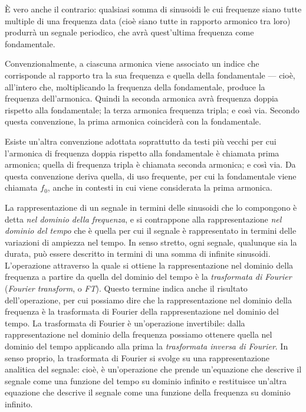 \documentclass[11pt]{report}
\begin{document}
È vero anche il contrario: qualsiasi somma di sinusoidi le cui frequenze siano tutte multiple di una frequenza data (cioè siano tutte in rapporto armonico tra loro) produrrà un segnale periodico, che avrà quest'ultima frequenza come fondamentale.

Convenzionalmente, a ciascuna armonica viene associato un indice che corrisponde al rapporto tra la sua frequenza e quella della fondamentale --- cioè, all'intero che, moltiplicando la frequenza della fondamentale, produce la frequenza dell'armonica. Quindi la seconda armonica avrà frequenza doppia rispetto alla fondamentale; la terza armonica frequenza tripla; e così via. Secondo questa convenzione, la prima armonica coinciderà con la fondamentale.

Esiste un'altra convenzione adottata soprattutto da testi più vecchi per cui l'armonica di frequenza doppia rispetto alla fondamentale è chiamata prima armonica; quella di frequenza tripla è chiamata seconda armonica; e così via. Da questa convenzione deriva quella, di uso frequente, per cui la fondamentale viene chiamata $f_0$, anche in contesti in cui viene considerata la prima armonica.

La rappresentazione di un segnale in termini delle sinusoidi che lo compongono è detta \emph{nel dominio della frequenza}, e si contrappone alla rappresentazione \emph{nel dominio del tempo} che è quella per cui il segnale è rappresentato in termini delle variazioni di ampiezza nel tempo. In senso stretto, ogni segnale, qualunque sia la durata, può essere descritto in termini di una somma di infinite sinusoidi. L'operazione attraverso la quale si ottiene la rappresentazione nel dominio della frequenza a partire da quella del dominio del tempo è la \emph{trasformata di Fourier} (\emph{Fourier transform}, o \emph{FT}). Questo termine indica anche il risultato dell'operazione, per cui possiamo dire che la rappresentazione nel dominio della frequenza è la trasformata di Fourier della rappresentazione nel dominio del tempo. La trasformata di Fourier è un'operazione invertibile: dalla rappresentazione nel dominio della frequenza possiamo ottenere quella nel dominio del tempo applicando alla prima la \emph{trasformata inversa di Fourier}. In senso proprio, la trasformata di Fourier si svolge su una rappresentazione analitica del segnale: cioè, è un'operazione che prende un'equazione che descrive il segnale come una funzione del tempo su dominio infinito e restituisce un'altra equazione che descrive il segnale come una funzione della frequenza su dominio infinito.
\end{document}
